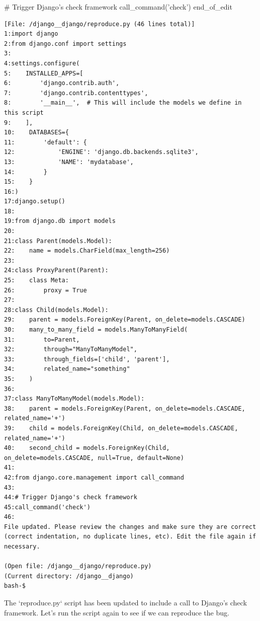 {\begin{agentbox}
\begin{CodeVerbatim}[breaklines=true, breakanywhere=true]
# Trigger Django's check framework
call_command('check')
end_of_edit
\end{CodeVerbatim}
\end{agentbox}
\begin{observationbox}\begin{Verbatim}[breaklines=true, breakanywhere=true]
[File: /django__django/reproduce.py (46 lines total)]
1:import django
2:from django.conf import settings
3:
4:settings.configure(
5:    INSTALLED_APPS=[
6:        'django.contrib.auth',
7:        'django.contrib.contenttypes',
8:        '__main__',  # This will include the models we define in this script
9:    ],
10:    DATABASES={
11:        'default': {
12:            'ENGINE': 'django.db.backends.sqlite3',
13:            'NAME': 'mydatabase',
14:        }
15:    }
16:)
17:django.setup()
18:
19:from django.db import models
20:
21:class Parent(models.Model):
22:    name = models.CharField(max_length=256)
23:
24:class ProxyParent(Parent):
25:    class Meta:
26:        proxy = True
27:
28:class Child(models.Model):
29:    parent = models.ForeignKey(Parent, on_delete=models.CASCADE)
30:    many_to_many_field = models.ManyToManyField(
31:        to=Parent,
32:        through="ManyToManyModel",
33:        through_fields=['child', 'parent'],
34:        related_name="something"
35:    )
36:
37:class ManyToManyModel(models.Model):
38:    parent = models.ForeignKey(Parent, on_delete=models.CASCADE, related_name='+')
39:    child = models.ForeignKey(Child, on_delete=models.CASCADE, related_name='+')
40:    second_child = models.ForeignKey(Child, on_delete=models.CASCADE, null=True, default=None)
41:
42:from django.core.management import call_command
43:
44:# Trigger Django's check framework
45:call_command('check')
46:
File updated. Please review the changes and make sure they are correct (correct indentation, no duplicate lines, etc). Edit the file again if necessary.

(Open file: /django__django/reproduce.py)
(Current directory: /django__django)
bash-$
\end{Verbatim}
\end{observationbox}
\begin{agentbox}
The `reproduce.py` script has been updated to include a call to Django's check framework. Let's run the script again to see if we can reproduce the bug.




\end{agentbox}}

